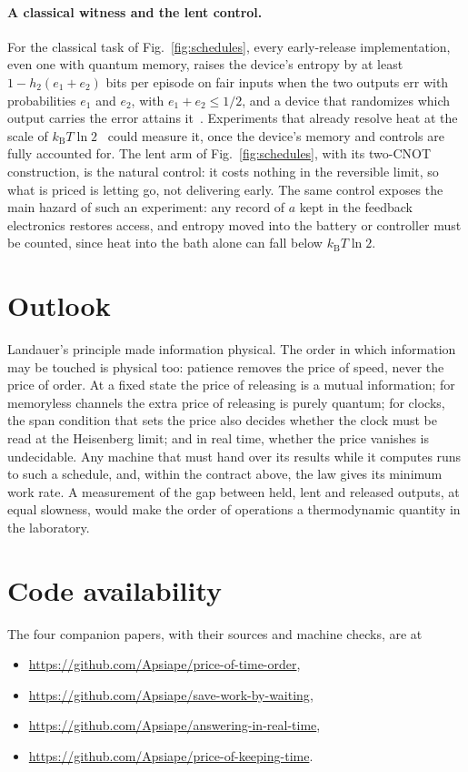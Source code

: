 \documentclass[11pt]{article}
\newcommand{\kB}{k_{\mathrm B}}
\begin{document}
\paragraph{A classical witness and the lent control.} For the classical task of Fig.~\ref{fig:schedules}, every early-release implementation, even one with quantum memory, raises the device's entropy by at least $1-h_2(e_1+e_2)$ bits per episode on fair inputs when the two outputs err with probabilities $e_1$ and $e_2$, with $e_1+e_2\le1/2$, and a device that randomizes which output carries the error attains it~\cite[App.~F]{Order}. Experiments that already resolve heat at the scale of $\kB T\ln2$~\cite{Berut12,Jun14} could measure it, once the device's memory and controls are fully accounted for. The lent arm of Fig.~\ref{fig:schedules}, with its two-CNOT construction, is the natural control: it costs nothing in the reversible limit, so what is priced is letting go, not delivering early. The same control exposes the main hazard of such an experiment: any record of $a$ kept in the feedback electronics restores access, and entropy moved into the battery or controller must be counted, since heat into the bath alone can fall below $\kB T\ln2$.

\section*{Outlook}
Landauer's principle made information physical. The order in which information may be touched is physical too: patience removes the price of speed, never the price of order. At a fixed state the price of releasing is a mutual information; for memoryless channels the extra price of releasing is purely quantum; for clocks, the span condition that sets the price also decides whether the clock must be read at the Heisenberg limit; and in real time, whether the price vanishes is undecidable. Any machine that must hand over its results while it computes runs to such a schedule, and, within the contract above, the law gives its minimum work rate. A measurement of the gap between held, lent and released outputs, at equal slowness, would make the order of operations a thermodynamic quantity in the laboratory.

\section*{Code availability}
The four companion papers, with their sources and machine checks, are at
\begin{itemize}
\item \url{https://github.com/Apsiape/price-of-time-order},
\item \url{https://github.com/Apsiape/save-work-by-waiting},
\item \url{https://github.com/Apsiape/answering-in-real-time},
\item \url{https://github.com/Apsiape/price-of-keeping-time}.
\end{itemize}
\end{document}
